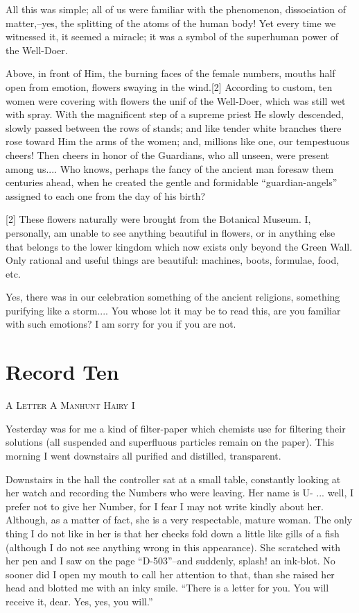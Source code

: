 \documentclass[11pt,openany]{book}
\newcommand{\bookchapterplain}[1]{%
  \clearpage\phantomsection
  \chapter*{#1}%
  \addcontentsline{toc}{chapter}{#1}%
  \markboth{#1}{#1}\thispagestyle{plain}}
\begin{document}
All this was simple; all of us were familiar with the phenomenon, dissociation of matter,--yes, the splitting of the atoms of the human body! Yet every time we witnessed it, it seemed a miracle; it was a symbol of the superhuman power of the Well-Doer.

Above, in front of Him, the burning faces of the female numbers, mouths half open from emotion, flowers swaying in the wind.[2] According to custom, ten women were covering with flowers the unif of the Well-Doer, which was still wet with spray. With the magnificent step of a supreme priest He slowly descended, slowly passed between the rows of stands; and like tender white branches there rose toward Him the arms of the women; and, millions like one, our tempestuous cheers! Then cheers in honor of the Guardians, who all unseen, were present among us.... Who knows, perhaps the fancy of the ancient man foresaw them centuries ahead, when he created the gentle and formidable ``guardian-angels'' assigned to each one from the day of his birth?

[2] These flowers naturally were brought from the Botanical Museum. I, personally, am unable to see anything beautiful in flowers, or in anything else that belongs to the lower kingdom which now exists only beyond the Green Wall. Only rational and useful things are beautiful: machines, boots, formulae, food, etc.

Yes, there was in our celebration something of the ancient religions, something purifying like a storm.... You whose lot it may be to read this, are you familiar with such emotions? I am sorry for you if you are not.

\bookchapterplain{Record Ten}

\begin{center}\textsc{A Letter A Manhunt Hairy I}\end{center}

Yesterday was for me a kind of filter-paper which chemists use for filtering their solutions (all suspended and superfluous particles remain on the paper). This morning I went downstairs all purified and distilled, transparent.

Downstairs in the hall the controller sat at a small table, constantly looking at her watch and recording the Numbers who were leaving. Her name is U- ... well, I prefer not to give her Number, for I fear I may not write kindly about her. Although, as a matter of fact, she is a very respectable, mature woman. The only thing I do not like in her is that her cheeks fold down a little like gills of a fish (although I do not see anything wrong in this appearance). She scratched with her pen and I saw on the page ``D-503''--and suddenly, splash! an ink-blot. No sooner did I open my mouth to call her attention to that, than she raised her head and blotted me with an inky smile. ``There is a letter for you. You will receive it, dear. Yes, yes, you will.''
\end{document}
